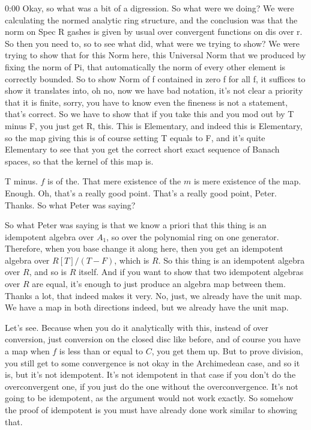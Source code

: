 \begin{unfinished}{0:00}
Okay, so what was a bit of a digression. So what were we doing? We were calculating the normed analytic ring structure, and the conclusion was that the norm on Spec R gashes is given by usual over convergent functions on dis over r. So then you need to, so to see what did, what were we trying to show? We were trying to show that for this Norm here, this Universal Norm that we produced by fixing the norm of Pi, that automatically the norm of every other element is correctly bounded. So to show Norm of f contained in zero f for all f, it suffices to show it translates into, oh no, now we have bad notation, it's not clear a priority that it is finite, sorry, you have to know even the fineness is not a statement, that's correct. So we have to show that if you take this and you mod out by T minus F, you just get R, this. This is Elementary, and indeed this is Elementary, so the map giving this is of course setting T equals to F, and it's quite Elementary to see that you get the correct short exact sequence of Banach spaces, so that the kernel of this map is.

T minus. $f$ is of the. That mere existence of the $m$ is mere existence of the map. Enough. Oh, that's a really good point. That's a really good point, Peter. Thanks. So what Peter was saying?

So what Peter was saying is that we know a priori that this thing is an idempotent algebra over $A_1$, so over the polynomial ring on one generator. Therefore, when you base change it along here, then you get an idempotent algebra over $R[T]/(T-F)$, which is $R$. So this thing is an idempotent algebra over $R$, and so is $R$ itself. And if you want to show that two idempotent algebras over $R$ are equal, it's enough to just produce an algebra map between them. Thanks a lot, that indeed makes it very. No, just, we already have the unit map. We have a map in both directions indeed, but we already have the unit map.

Let's see. Because when you do it analytically with this, instead of over conversion, just conversion on the closed disc like before, and of course you have a map when $f$ is less than or equal to $C$, you get them up. But to prove division, you still get to some convergence is not okay in the Archimedean case, and so it is, but it's not idempotent. It's not idempotent in that case if you don't do the overconvergent one, if you just do the one without the overconvergence. It's not going to be idempotent, as the argument would not work exactly. So somehow the proof of idempotent is you must have already done work similar to showing that.


\end{unfinished}
